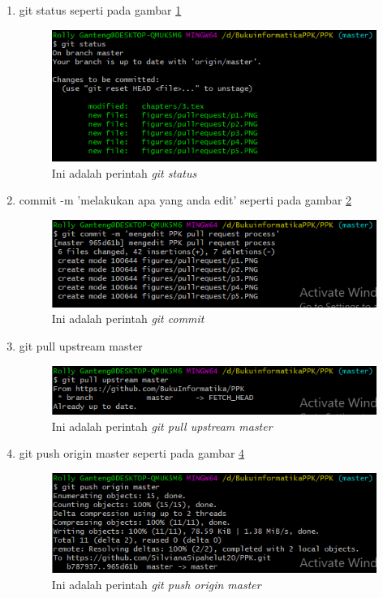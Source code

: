 \begin{enumerate}
\item git status seperti pada gambar \ref{fig:p7}
		\begin{figure}[H]
		\centering
		\includegraphics[width=1\textwidth]{figures/pullrequest/p7.PNG}
		\caption{Ini adalah perintah \textit{git status}}
		\label{fig:p7}
		\end{figure}
\item commit -m 'melakukan apa yang anda edit' seperti pada gambar \ref{fig:p8}
		\begin{figure}[H]
		\centering
		\includegraphics[width=1\textwidth]{figures/pullrequest/p8.PNG}
		\caption{Ini adalah perintah \textit{git commit}}
		\label{fig:p8}
		\end{figure}
\item git pull upstream master
		\begin{figure}[H]
		\centering
		\includegraphics[width=1\textwidth]{figures/pullrequest/p9.PNG}
		\caption{Ini adalah perintah \textit{git pull upstream master}}
		\label{fig:p9}
		\end{figure}
\item git push origin master seperti pada gambar \ref{fig:p10}
		\begin{figure}[H]
		\centering
		\includegraphics[width=1\textwidth]{figures/pullrequest/p10.PNG}
		\caption{Ini adalah perintah \textit{git push origin master}}
		\label{fig:p10}
		\end{figure}
\end{enumerate}

